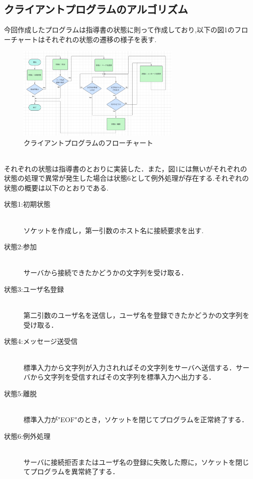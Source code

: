 \documentclass[dvipdfmx]{jarticle}
\begin{document}
\subsection{クライアントプログラムのアルゴリズム}
今回作成したプログラムは指導書の状態に則って作成しており,以下の図1のフローチャートはそれぞれの状態の遷移の様子を表す.
\begin{figure}[h]
    \centering
    \includegraphics[width=8cm]{4-1clienthurotya.png}
    \caption{クライアントプログラムのフローチャート}
\end{figure}
\\それぞれの状態は指導書のとおりに実装した．また，図1には無いがそれぞれの状態の処理で異常が発生した場合は状態6として例外処理が存在する.それぞれの状態の概要は以下のとおりである.
\begin{description}
    \item[状態1:初期状態] 　\\  ソケットを作成し，第一引数のホスト名に接続要求を出す.
    \item[状態2:参加]　\\ サーバから接続できたかどうかの文字列を受け取る．
    \item[状態3:ユーザ名登録]　\\ 第二引数のユーザ名を送信し，ユーザ名を登録できたかどうかの文字列を受け取る．
    \item[状態4:メッセージ送受信]　\\ 標準入力から文字列が入力されればその文字列をサーバへ送信する．サーバから文字列を受信すればその文字列を標準入力へ出力する．
    \item[状態5:離脱]　\\ 標準入力が"EOF"のとき，ソケットを閉じてプログラムを正常終了する．
    \item[状態6:例外処理]　\\ サーバに接続拒否またはユーザ名の登録に失敗した際に，ソケットを閉じてプログラムを異常終了する．
\end{description}
\end{document}
